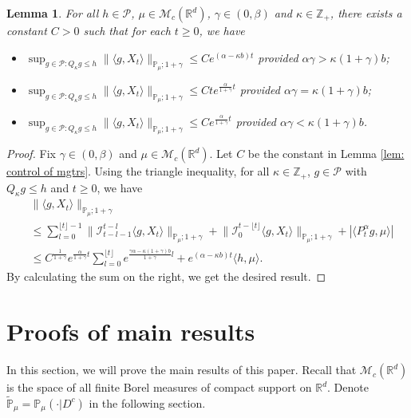 \documentclass[12pt,a4paper]{amsart}
\theoremstyle{plain}
\newtheorem{lem}[thm]{Lemma}
\theoremstyle{definition}
\numberwithin{equation}{section}
\begin{document}
\begin{lem}
\label{lem: control moment}
    For all $h \in \mathcal P$, $\mu \in \mathcal M_c(\mathbb R^d)$, $\gamma\in (0, \beta)$ and $\kappa \in \mathbb Z_+$, there exists a constant $C > 0$ such that for each $t\geq 0$, we have
\begin{itemize}
\item[(1)]
    $\sup_{g\in \mathcal P: Q_\kappa g \leq h}\|\langle g,X_t\rangle\|_{\mathbb{P}_{\mu};1+\gamma}\leq C e^{(\alpha-\kappa b)t}$ provided $\alpha\gamma > \kappa (1+\gamma)b$;
\item[(2)]
    $\sup_{g\in \mathcal P: Q_\kappa g \leq h}\|\langle g,X_t\rangle\|_{\mathbb{P}_{\mu};1+\gamma}\leq C te^{\frac{\alpha}{1+\gamma}t}$ provided $\alpha\gamma = \kappa (1+\gamma)b$;
\item[(3)]
    $\sup_{g\in \mathcal P: Q_\kappa g \leq h} \|\langle g,X_t\rangle\|_{\mathbb{P}_{\mu};1+\gamma}\leq C e^{\frac{\alpha}{1+\gamma}t}$ provided $\alpha\gamma < \kappa (1+\gamma)b$.
\end{itemize}
\end{lem}
\begin{proof}
    Fix $\gamma \in (0,\beta)$ and $\mu \in \mathcal M_c(\mathbb R^d)$.
    Let $C$ be the constant in Lemma \ref{lem: control of mgtrs}.
    Using the triangle inequality, for all $\kappa\in \mathbb Z_+$, $g \in \mathcal P$ with $Q_\kappa g \leq h$ and $t\geq 0$, we have
\begin{equation}\begin{split}
    &\|\langle g,X_t\rangle\|_{\mathbb P_\mu;1+\gamma}
        \\ &\leq \sum_{l=0}^{\lfloor t\rfloor - 1}\big\| \mathcal{I}_{t-l-1}^{t-l}\langle g,X_t\rangle \big\|_{\mathbb P_\mu;1+\gamma}+\big\| \mathcal{I}_{0}^{t-\lfloor t \rfloor}\langle g,X_t\rangle  \big\|_{\mathbb P_\mu;1+\gamma}
    + |\langle P^\alpha_t g,\mu\rangle|
    \\ &\leq C^{\frac{1}{1+\gamma}} e^{\frac{\alpha}{1+\gamma}t} \sum_{l=0}^{\lfloor t\rfloor} e^{\frac{\gamma\alpha-\kappa (1+\gamma)b}{1+\gamma} l} + e^{(\alpha - \kappa b)t} \langle h,\mu\rangle.
\end{split}\end{equation}
    By calculating the sum on the right, we get the desired result.
\end{proof}

\section{Proofs of main results}
    In this section, we will prove the main results of this paper. Recall that $\mathcal{M}_c(\mathbb{R}^d)$ is the space of all finite Borel measures of compact support on $\mathbb{R}^d$. Denote  $\mathbb{\tilde{P}}_{\mu}=\mathbb{P}_{\mu}(\cdot|D^c)$ in the following section.
\end{document}
